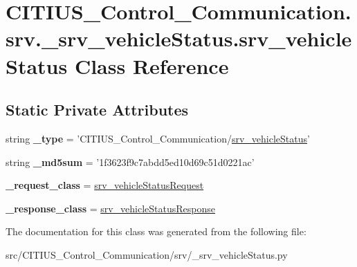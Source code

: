 \hypertarget{class_c_i_t_i_u_s___control___communication_1_1srv_1_1__srv__vehicle_status_1_1srv__vehicle_status}{\section{\-C\-I\-T\-I\-U\-S\-\_\-\-Control\-\_\-\-Communication.\-srv.\-\_\-srv\-\_\-vehicle\-Status.\-srv\-\_\-vehicle\-Status \-Class \-Reference}
\label{class_c_i_t_i_u_s___control___communication_1_1srv_1_1__srv__vehicle_status_1_1srv__vehicle_status}
}
\subsection*{\-Static \-Private \-Attributes}
\begin{DoxyCompactItemize}
\item 
\hypertarget{class_c_i_t_i_u_s___control___communication_1_1srv_1_1__srv__vehicle_status_1_1srv__vehicle_status_a11634f34b6da818725338cdc6587404e}{string {\bfseries \-\_\-type} = '\-C\-I\-T\-I\-U\-S\-\_\-\-Control\-\_\-\-Communication/\hyperlink{class_c_i_t_i_u_s___control___communication_1_1srv_1_1__srv__vehicle_status_1_1srv__vehicle_status}{srv\-\_\-vehicle\-Status}'}\label{class_c_i_t_i_u_s___control___communication_1_1srv_1_1__srv__vehicle_status_1_1srv__vehicle_status_a11634f34b6da818725338cdc6587404e}

\item 
\hypertarget{class_c_i_t_i_u_s___control___communication_1_1srv_1_1__srv__vehicle_status_1_1srv__vehicle_status_a16d2eae76bb728073be688f660628a74}{string {\bfseries \-\_\-md5sum} = '1f3623f9c7abdd5ed10d69c51d0221ac'}\label{class_c_i_t_i_u_s___control___communication_1_1srv_1_1__srv__vehicle_status_1_1srv__vehicle_status_a16d2eae76bb728073be688f660628a74}

\item 
\hypertarget{class_c_i_t_i_u_s___control___communication_1_1srv_1_1__srv__vehicle_status_1_1srv__vehicle_status_a739b2afdf34b66785699af42a33f2b95}{{\bfseries \-\_\-request\-\_\-class} = \hyperlink{class_c_i_t_i_u_s___control___communication_1_1srv_1_1__srv__vehicle_status_1_1srv__vehicle_status_request}{srv\-\_\-vehicle\-Status\-Request}}\label{class_c_i_t_i_u_s___control___communication_1_1srv_1_1__srv__vehicle_status_1_1srv__vehicle_status_a739b2afdf34b66785699af42a33f2b95}

\item 
\hypertarget{class_c_i_t_i_u_s___control___communication_1_1srv_1_1__srv__vehicle_status_1_1srv__vehicle_status_a69a5e2f4046a1cfbe4f4d74b5cf4ea0a}{{\bfseries \-\_\-response\-\_\-class} = \hyperlink{class_c_i_t_i_u_s___control___communication_1_1srv_1_1__srv__vehicle_status_1_1srv__vehicle_status_response}{srv\-\_\-vehicle\-Status\-Response}}\label{class_c_i_t_i_u_s___control___communication_1_1srv_1_1__srv__vehicle_status_1_1srv__vehicle_status_a69a5e2f4046a1cfbe4f4d74b5cf4ea0a}

\end{DoxyCompactItemize}


\-The documentation for this class was generated from the following file\-:\begin{DoxyCompactItemize}
\item 
src/\-C\-I\-T\-I\-U\-S\-\_\-\-Control\-\_\-\-Communication/srv/\-\_\-srv\-\_\-vehicle\-Status.\-py\end{DoxyCompactItemize}
